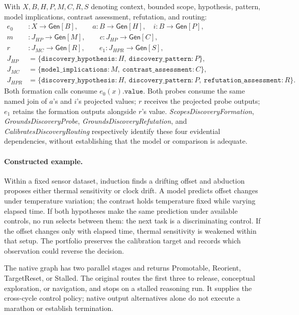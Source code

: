 With $X,B,H,P,M,C,R,S$ denoting context, bounded scope, hypothesis, pattern,
model implications, contrast assessment, refutation, and routing:
\[
\begin{aligned}
 e_0 &:X\to\mathsf{Gen}[B],\qquad
 a:B\to\mathsf{Gen}[H],\quad i:B\to\mathsf{Gen}[P],\\
 m &:J_{HP}\to\mathsf{Gen}[M],\qquad
 c:J_{HP}\to\mathsf{Gen}[C],\\
 r &:J_{MC}\to\mathsf{Gen}[R],\qquad
 e_1:J_{HPR}\to\mathsf{Gen}[S],\\
 J_{HP}&=\{\mathtt{discovery\_hypothesis}:H,\ \mathtt{discovery\_pattern}:P\},\\
 J_{MC}&=\{\mathtt{model\_implications}:M,\ \mathtt{contrast\_assessment}:C\},\\
 J_{HPR}&=\{\mathtt{discovery\_hypothesis}:H,\ \mathtt{discovery\_pattern}:P,
          \ \mathtt{refutation\_assessment}:R\}.
\end{aligned}
\]
Both formation calls consume $e_0(x).\mathtt{value}$. Both probes consume the
same named join of $a$'s and $i$'s projected values; $r$ receives the projected
probe outputs; $e_1$ retains the formation outputs alongside $r$'s value.
\emph{Scopes\allowbreak Discovery\allowbreak Formation}, \emph{Grounds\allowbreak Discovery\allowbreak Probe},
\emph{Grounds\allowbreak Discovery\allowbreak Refutation}, and \emph{Calibrates\allowbreak Discovery\allowbreak Routing}
respectively identify these four evidential dependencies, without establishing
that the model or comparison is adequate.

\paragraph{Constructed example.}
Within a fixed sensor dataset, induction finds a drifting offset and abduction
proposes either thermal sensitivity or clock drift. A model predicts offset
changes under temperature variation; the contrast holds temperature fixed while
varying elapsed time. If both hypotheses make the same prediction under available
controls, no run selects between them: the next task is a discriminating control.
If the offset changes only with elapsed time, thermal sensitivity is weakened
within that setup. The portfolio preserves the calibration target and records
which observation could reverse the decision.

The native graph has two parallel stages and returns Promotable, Reorient,
TargetReset, or Stalled. The original routes the first three to release,
conceptual exploration, or navigation, and stops on a stalled reasoning run.
It supplies the cross-cycle control policy; native output alternatives alone do
not execute a marathon or establish termination.

